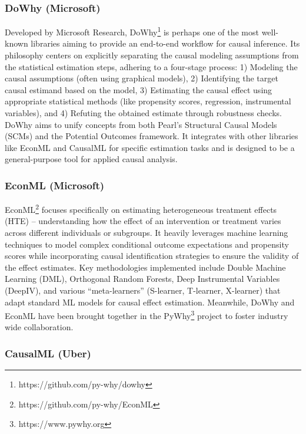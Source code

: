 {\subsubsection{DoWhy (Microsoft)}

Developed by Microsoft Research, DoWhy\footnote{https://github.com/py-why/dowhy} \cite{sharma2020dowhy} is perhaps one of the most well-known libraries aiming to provide an end-to-end workflow for causal inference. Its philosophy centers on explicitly separating the causal modeling assumptions from the statistical estimation steps, adhering to a four-stage process: 1) Modeling the causal assumptions (often using graphical models), 2) Identifying the target causal estimand based on the model, 3) Estimating the causal effect using appropriate statistical methods (like propensity scores, regression, instrumental variables), and 4) Refuting the obtained estimate through robustness checks. DoWhy aims to unify concepts from both Pearl's Structural Causal Models (SCMs) and the Potential Outcomes framework. It integrates with other libraries like EconML and CausalML for specific estimation tasks and is designed to be a general-purpose tool for applied causal analysis.

\subsubsection{EconML (Microsoft)}

EconML\footnote{https://github.com/py-why/EconML} \cite{oprescu2019econml} focuses specifically on estimating heterogeneous treatment effects (HTE) – understanding how the effect of an intervention or treatment varies across different individuals or subgroups. It heavily leverages machine learning techniques to model complex conditional outcome expectations and propensity scores while incorporating causal identification strategies to ensure the validity of the effect estimates. Key methodologies implemented include Double Machine Learning (DML), Orthogonal Random Forests, Deep Instrumental Variables (DeepIV), and various ``meta-learners'' (S-learner, T-learner, X-learner) that adapt standard ML models for causal effect estimation. Meanwhile, DoWhy and EconML have been brought together in the PyWhy\footnote{https://www.pywhy.org} project to foster industry wide collaboration. 

\subsubsection{CausalML (Uber)}


}
